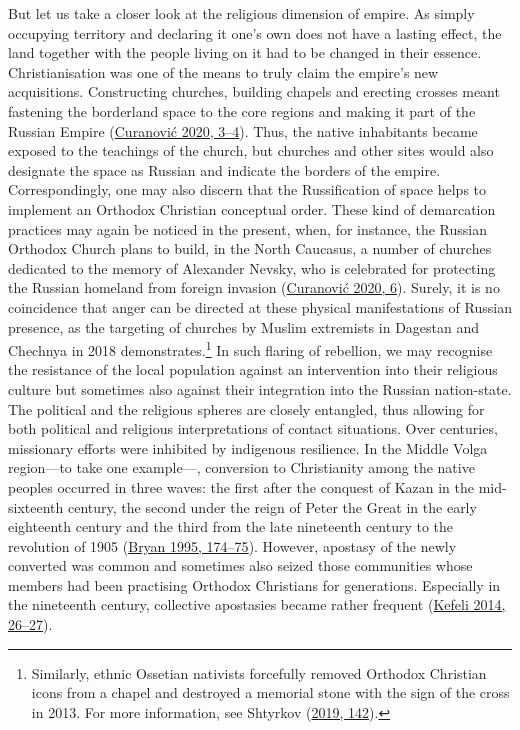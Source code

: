 \documentclass[
  english,
  a4paper,
  DIV=12,
  footlines=2.1,
  usegeometry=true]{scrartcl}
\begin{document}
\leavevmode\marginpar{\textcolor{parnum}{{[}7{]}}}But let us take a
closer look at the religious dimension of empire. As simply occupying
territory and declaring it one's own does not have a lasting effect, the
land together with the people living on it had to be changed in their
essence. Christianisation was one of the means to truly claim the
empire's new acquisitions. Constructing churches, building chapels and
erecting crosses meant fastening the borderland space to the core
regions and making it part of the Russian Empire
(\protect\hyperlink{ref-curanovic_guarding_2020}{Curanović 2020, 3--4}).
Thus, the native inhabitants became exposed to the teachings of the
church, but churches and other sites would also designate the space as
Russian and indicate the borders of the empire. Correspondingly, one may
also discern that the Russification of space helps to implement an
Orthodox Christian conceptual order. These kind of demarcation practices
may again be noticed in the present, when, for instance, the Russian
Orthodox Church plans to build, in the North Caucasus, a number of
churches dedicated to the memory of Alexander Nevsky, who is celebrated
for protecting the Russian homeland from foreign invasion
(\protect\hyperlink{ref-curanovic_guarding_2020}{Curanović 2020, 6}).
Surely, it is no coincidence that anger can be directed at these
physical manifestations of Russian presence, as the targeting of
churches by Muslim extremists in Dagestan and Chechnya in 2018
demonstrates.\footnote{Similarly, ethnic Ossetian nativists forcefully
  removed Orthodox Christian icons from a chapel and destroyed a
  memorial stone with the sign of the cross in 2013. For more
  information, see Shtyrkov
  (\protect\hyperlink{ref-shtyrkov_sacred_2019}{2019, 142}).} In such
flaring of rebellion, we may recognise the resistance of the local
population against an intervention into their religious culture but
sometimes also against their integration into the Russian nation-state.
The political and the religious spheres are closely entangled, thus
allowing for both political and religious interpretations of contact
situations. Over centuries, missionary efforts were inhibited by
indigenous resilience. In the Middle Volga region---to take one
example---, conversion to Christianity among the native peoples occurred
in three waves: the first after the conquest of Kazan in the
mid-sixteenth century, the second under the reign of Peter the Great in
the early eighteenth century and the third from the late nineteenth
century to the revolution of 1905
(\protect\hyperlink{ref-bryan_organization_1995}{Bryan 1995, 174--75}).
However, apostasy of the newly converted was common and sometimes also
seized those communities whose members had been practising Orthodox
Christians for generations. Especially in the nineteenth century,
collective apostasies became rather frequent
(\protect\hyperlink{ref-kefeli_becoming_2014}{Kefeli 2014, 26--27}).
\end{document}
